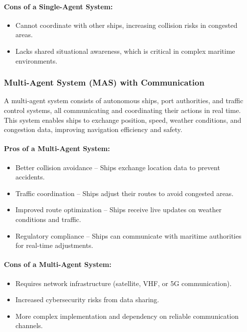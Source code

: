 \documentclass{article}
\begin{document}
\paragraph{Cons of a Single-Agent System:}
\begin{itemize}
    \item Cannot coordinate with other ships, increasing collision risks in congested areas.
    \item Lacks shared situational awareness, which is critical in complex maritime environments.
\end{itemize}

\subsubsection{Multi-Agent System (MAS) with Communication}
A multi-agent system consists of autonomous ships, port authorities, and traffic control systems, all communicating and coordinating their actions in real time. This system enables ships to exchange position, speed, weather conditions, and congestion data, improving navigation efficiency and safety.

\paragraph{Pros of a Multi-Agent System:}
\begin{itemize}
    \item Better collision avoidance – Ships exchange location data to prevent accidents.
    \item Traffic coordination – Ships adjust their routes to avoid congested areas.
    \item Improved route optimization – Ships receive live updates on weather conditions and traffic.
    \item Regulatory compliance – Ships can communicate with maritime authorities for real-time adjustments.
\end{itemize}

\paragraph{Cons of a Multi-Agent System:}
\begin{itemize}
    \item Requires network infrastructure (satellite, VHF, or 5G communication).
    \item Increased cybersecurity risks from data sharing.
    \item More complex implementation and dependency on reliable communication channels.
\end{itemize}
\end{document}
